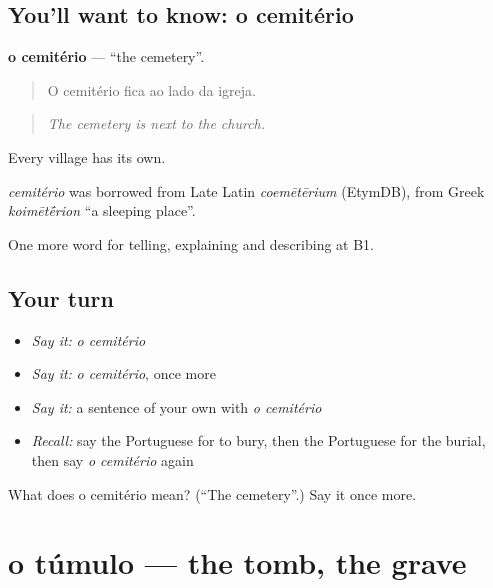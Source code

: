 \subsection*{You'll want to know: o cemitério}
\textbf{o cemitério} — \textquotedblleft{}the cemetery\textquotedblright{}.

\begin{quote}
O cemitério fica ao lado da igreja.
\end{quote}

\begin{quote}
\emph{The cemetery is next to the church.}
\end{quote}

Every village has its own.

\begin{cousinweb}
\emph{cemitério} was borrowed from Late Latin \emph{coemētērium} (EtymDB), from Greek \emph{koimēt\'{\={e}}rion} \textquotedblleft{}a sleeping place\textquotedblright{}.
\end{cousinweb}

\begin{grammarlens}[title={What you've built}]
One more word for telling, explaining and describing at B1.
\end{grammarlens}

\subsection*{Your turn}
\begin{itemize}
\raggedright
  \item \emph{Say it:} \emph{o cemitério}
  \item \emph{Say it:} \emph{o cemitério}, once more
  \item \emph{Say it:} a sentence of your own with \emph{o cemitério}
  \item \emph{Recall:} say the Portuguese for to bury, then the Portuguese for the burial, then say \emph{o cemitério} again
\end{itemize}

\begin{tcolorbox}[breakable,colback=teal!4,colframe=teal!35!black,title={Before you move on}]
What does o cemitério mean? (\textquotedblleft{}The cemetery\textquotedblright{}.) Say it once more.
\end{tcolorbox}
\section[o túmulo]{o túmulo — the tomb, the grave}

